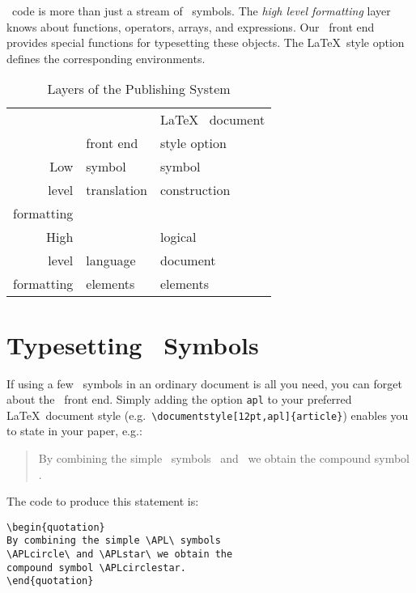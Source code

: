 \APL\ code is more than just a stream of \APL\ symbols.
The {\em high level formatting} layer knows about functions, operators,
arrays, and expressions. Our \APL\ front end provides special
functions for typesetting these objects. The
\LaTeX\ style option defines the corresponding environments.
 
\begin{table}[htbp]\centering\small
{\footnotesize{}\advance\baselineskip-2pt
\begin{tabular}{r||l|l}
			& \mbox{\APL} & \mbox{\LaTeX\ } document \\
			& \TUBedit{9}front end    &     style option \\
\hline\hline
Low 				   	& symbol 		 	& symbol  \\
level 					& translation		& construction \\
formatting				& \ 				& \ 	\\
\hline
High					& \mbox{\APL}		& logical \\
level					& language 			& document \\
formatting				& elements 			& elements \\
\end{tabular}
\caption{Layers of the Publishing System\label{layers}}
}
\end{table}
 
\section{Typesetting \bfAPL\ Symbols}
 
If using a few \APL\ symbols in
an ordinary document is all you need, you can forget about the
\APL\ front end. Simply adding the option \verb+apl+ to
your preferred \LaTeX\ document style (e.g.\
\verb+\documentstyle[12pt,apl]{article}+)
enables you to state in your paper, e.g.:
\begin{quotation}
By combining the simple \APL\ symbols
\APLcircle\ and \APLstar\ we obtain the
compound symbol \APLcirclestar.
\end{quotation}
The code to produce this statement is:
\begin{verbatim}
\begin{quotation}
By combining the simple \APL\ symbols
\APLcircle\ and \APLstar\ we obtain the
compound symbol \APLcirclestar.
\end{quotation}
\end{verbatim}
 
